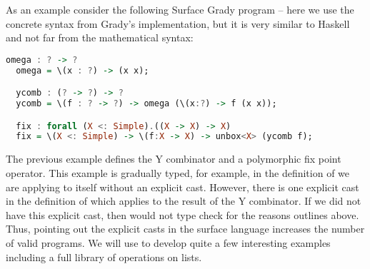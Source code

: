 As an example consider the following Surface Grady program -- here we
use the concrete syntax from Grady's implementation, but it is very
similar to Haskell and not far from the mathematical syntax:
\begin{lstlisting}[language=Haskell]
  omega : ? -> ?
  omega = \(x : ?) -> (x x);

  ycomb : (? -> ?) -> ?
  ycomb = \(f : ? -> ?) -> omega (\(x:?) -> f (x x));

  fix : forall (X <: Simple).((X -> X) -> X)
  fix = \(X <: Simple) -> \(f:X -> X) -> unbox<X> (ycomb f);
\end{lstlisting}
The previous example defines the Y combinator and a polymorphic fix
point operator.  This example is gradually typed, for example, in the
definition of  we are applying  to itself
without an explicit cast.  However, there is one explicit cast in the
definition of  which applies  to the
result of the Y combinator.  If we did not have this explicit cast,
then  would not type check for the reasons outlines
above.  Thus, pointing out the explicit casts in the surface language
increases the number of valid programs.  We will use  to
develop quite a few interesting examples including a full library of
operations on lists.

